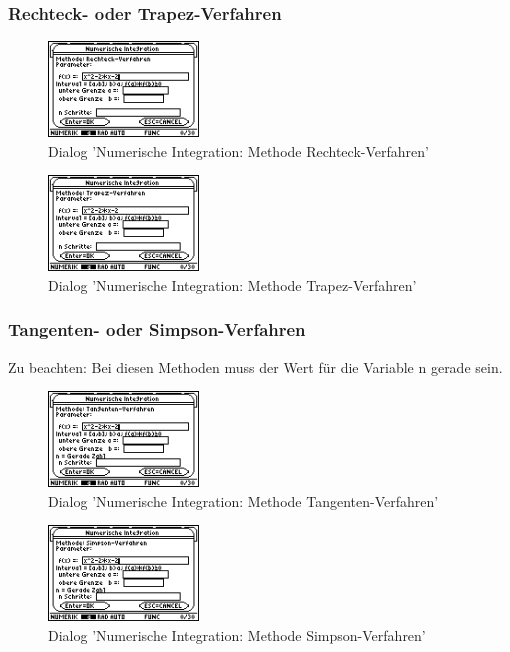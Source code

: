 \documentclass[a5paper,9pt]{scrreprt}
\begin{document}
\subsubsection*{Rechteck- oder Trapez-Verfahren}
\begin{figure}[h]
  \centering
  \includegraphics[width=4cm]{img/nummeth_image024.png}
  \caption{Dialog 'Numerische Integration: Methode Rechteck-Verfahren'}
  \label{fig:ParameterIntegrationRechteck}
\end{figure}
\begin{figure}[h]
  \centering
  \includegraphics[width=4cm]{img/nummeth_image026.png}
  \caption{Dialog 'Numerische Integration: Methode Trapez-Verfahren'}
  \label{fig:ParameterIntegrationTrapez}
\end{figure}

\newpage
\subsubsection*{Tangenten- oder Simpson-Verfahren}
Zu beachten: Bei diesen Methoden muss der Wert f\"ur die Variable n gerade sein.
\begin{figure}[h]
  \centering
  \includegraphics[width=4cm]{img/nummeth_image028.png}
  \caption{Dialog 'Numerische Integration: Methode Tangenten-Verfahren'}
  \label{fig:ParameterIntegrationTangente}
\end{figure}
\begin{figure}[h]
  \centering
  \includegraphics[width=4cm]{img/nummeth_image030.png}
  \caption{Dialog 'Numerische Integration: Methode Simpson-Verfahren'}
  \label{fig:ParameterIntegrationSimpson}
\end{figure}
\end{document}
